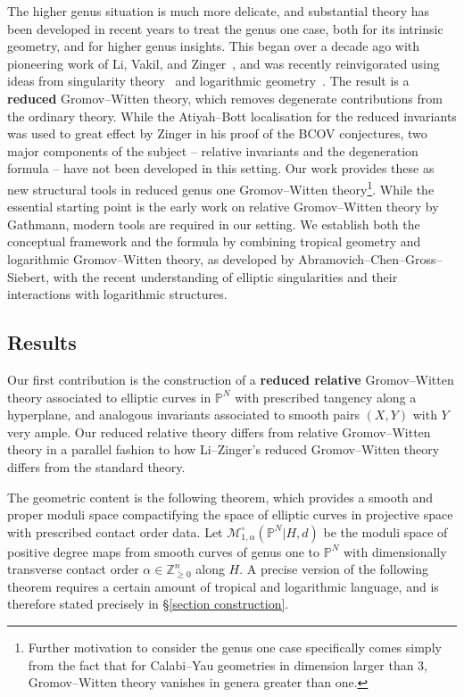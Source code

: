 \documentclass[11pt]{amsart}
\theoremstyle{definition}
\theoremstyle{definition}
\begin{document}
The higher genus situation is much more delicate, and substantial theory has been developed in recent years to treat the genus one case, both for its intrinsic geometry, and for higher genus insights. This began over a decade ago with pioneering work of Li, Vakil, and Zinger~\cite{redgone,VZ,LZ,lz2,zingerstvsred,zingred}, and was recently reinvigorated using ideas from singularity theory~\cite{BCM18,HL,SMY1,VISC} and logarithmic geometry~\cite{RSPW,RSPW2,BC20}. The result is a \textbf{reduced} Gromov--Witten theory, which removes degenerate contributions from the ordinary theory. While the Atiyah--Bott localisation for the reduced invariants was used to great effect by Zinger in his proof of the BCOV conjectures, two major components of the subject -- relative invariants and the degeneration formula -- have not been developed in this setting. Our work provides these as new {structural} tools in reduced genus one Gromov--Witten theory\footnote{Further motivation to consider the genus one case specifically comes simply from the fact that for Calabi--Yau geometries in dimension larger than $3$, Gromov--Witten theory vanishes in genera greater than one.}. While the essential starting point is the early work on relative Gromov--Witten theory by Gathmann, modern tools are required in our setting. We establish both the conceptual framework and the formula by combining tropical geometry and logarithmic Gromov--Witten theory, as developed by Abramovich--Chen--Gross--Siebert, with the recent understanding of elliptic singularities and their interactions with logarithmic structures. 


\subsection{Results} Our first contribution is the construction of a \textbf{reduced relative} Gromov--Witten theory associated to elliptic curves in $\mathbb P^N$ with prescribed tangency along a hyperplane, and analogous invariants associated to smooth pairs $(X,Y)$ with $Y$ very ample. Our reduced relative theory differs from relative Gromov--Witten theory in a parallel fashion to how Li--Zinger's reduced Gromov--Witten theory differs from the standard theory. 

The geometric content is the following theorem, which provides a smooth and proper moduli space compactifying the space of elliptic curves in projective space with prescribed contact order data. Let $\mathcal M_{1,\alpha}^\circ(\mathbb P^N|H,d)$ be the moduli space of positive degree maps from smooth curves of genus one to $\mathbb P^N$ with dimensionally transverse contact order $\alpha\in\mathbb Z^n_{\geq 0}$ along $H$. A precise version of the following theorem requires a certain amount of tropical and logarithmic language, and is therefore stated precisely in \S \ref{section construction}.
\end{document}
